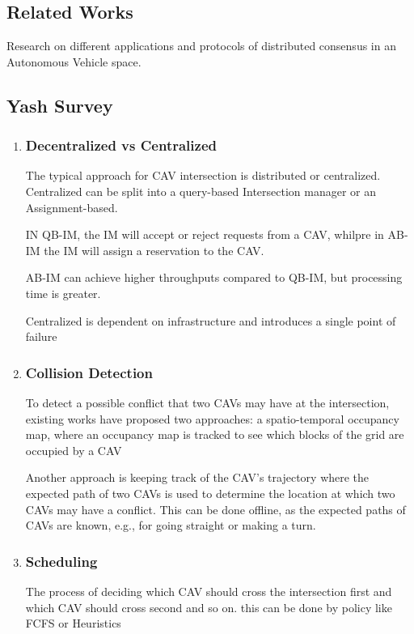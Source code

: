 \documentclass[fleqn,10pt]{olplainarticle}
\begin{document}
\subsection*{Related Works}

Research on different applications and protocols of distributed consensus in an Autonomous Vehicle space. 

\subsection{Yash Survey}

\begin{enumerate}


\item
\subsubsection{Decentralized vs Centralized }
The typical approach for CAV intersection is distributed or centralized. Centralized can be split into a query-based Intersection manager or an Assignment-based. 

IN QB-IM, the IM will accept or reject requests from a CAV, whilpre in AB-IM the IM will assign a reservation to the CAV. 

AB-IM can achieve higher throughputs compared to QB-IM, but processing time is greater.

Centralized is dependent on infrastructure and introduces a single point of failure 

\item

\subsubsection{Collision Detection}
To detect a possible conflict that two CAVs may have at the intersection, existing works have proposed two approaches: 
a spatio-temporal occupancy map, where an occupancy map is tracked to see which blocks of the grid are occupied by a CAV

Another approach is keeping track of the CAV's trajectory where the expected path of two CAVs is used to determine the location at which two CAVs may have a conflict. This can be done offline, as the expected paths of CAVs are known, e.g., for going straight or making a turn.

\item

\subsubsection{Scheduling }
The process of deciding which CAV should cross the intersection first and which CAV should cross second and so on. this can be done by policy like FCFS or Heuristics


\end{enumerate}
\end{document}
